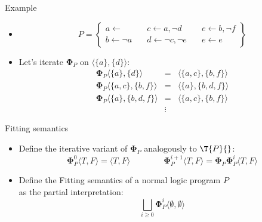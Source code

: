 \begin{frame}{Example}
  \begin{itemize}
  \item<1-> []
    \[
    P
    =
    \left\{
      \begin{array}{lll}
        a \leftarrow                  \quad &
        c \leftarrow a, \neg d       \quad &
        e \leftarrow b, \neg f
        \\
        b \leftarrow \neg a          \quad &
        d \leftarrow \neg c, \neg e \quad &
        e \leftarrow e
      \end{array}
    \right\}
    \]
    \medskip
  \item<2-> Let's iterate ${\mathbf{\Phi}}_{P}$ on $\langle \{a\}, \{d\}\rangle$:
    \[
    \begin{array}{rcl}
    {\mathbf{\Phi}}_{P}\langle\{a\}  ,\{d\}    \rangle &=&\langle\{a, c\} ,\{b,f\}  \rangle
    \\
    {\mathbf{\Phi}}_{P}\langle\{a,c\},\{b,f\}  \rangle &=&\langle\{a\}    ,\{b,d,f\}\rangle
    \\
    {\mathbf{\Phi}}_{P}\langle\{a\}  ,\{b,d,f\}\rangle &=&\langle\{a,c\}  ,\{b,f\}  \rangle
    \\
    & \vdots &
    \end{array}
    \]
  \end{itemize}
\end{frame}
\begin{frame}{Fitting semantics}
  \bigskip
  \begin{itemize}
  \item<1-> Define the iterative variant of ${\mathbf{\Phi}}_P$ analogously to $\T{P}{}$:
    \[
    {\mathbf{\Phi}}_P^0\langle T, F \rangle = \langle T, F \rangle
    \qquad\qquad
    {\mathbf{\Phi}}_P^{i+1}\langle T, F \rangle =
    {\mathbf{\Phi}}_P{\mathbf{\Phi}}_P^i\langle T, F \rangle
    \]
  \item<2-> Define the \alert{Fitting semantics} of a normal logic program $P$\\
    as the partial interpretation:
    \[
    \textstyle{\bigsqcup_{i \geq 0}} {\mathbf{\Phi}}_P^i \langle \emptyset, \emptyset \rangle
    \]
  \end{itemize}
\end{frame}
